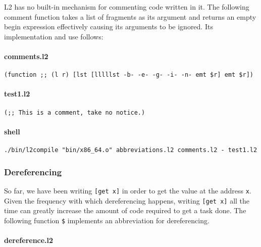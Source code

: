 \documentclass[]{article}
\let\oldparagraph\paragraph
\renewcommand{\paragraph}[1]{\oldparagraph{#1}\mbox{}}
\begin{document}
L2 has no built-in mechanism for commenting code written in it. The
following comment function takes a list of fragments as its argument and
returns an empty begin expression effectively causing its arguments to
be ignored. Its implementation and use follows:

\hypertarget{comments.l2}{%
\paragraph{comments.l2}\label{comments.l2}}

\begin{verbatim}
(function ;; (l r) [lst [lllllst -b- -e- -g- -i- -n- emt $r] emt $r])
\end{verbatim}

\hypertarget{test1.l2}{%
\paragraph{test1.l2}\label{test1.l2}}

\begin{verbatim}
(;; This is a comment, take no notice.)
\end{verbatim}

\hypertarget{shell}{%
\paragraph{shell}\label{shell}}

\begin{verbatim}
./bin/l2compile "bin/x86_64.o" abbreviations.l2 comments.l2 - test1.l2
\end{verbatim}

\hypertarget{dereferencing}{%
\subsubsection{Dereferencing}\label{dereferencing}}

So far, we have been writing \texttt{{[}get\ x{]}} in order to get the
value at the address \texttt{x}. Given the frequency with which
dereferencing happens, writing \texttt{{[}get\ x{]}} all the time can
greatly increase the amount of code required to get a task done. The
following function \texttt{\$} implements an abbreviation for
dereferencing.

\hypertarget{dereference.l2}{%
\paragraph{dereference.l2}\label{dereference.l2}}
\end{document}
